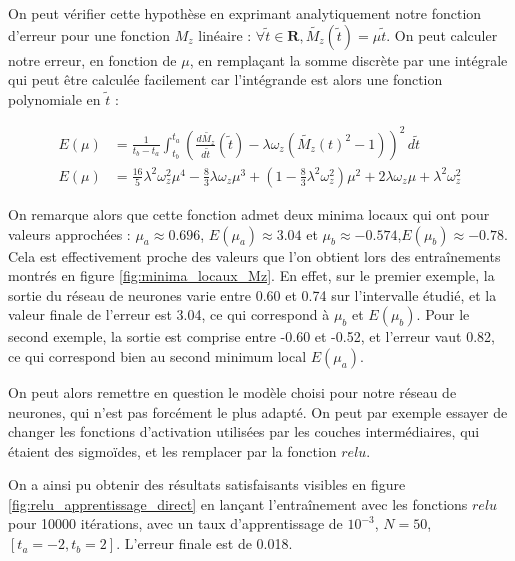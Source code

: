 \documentclass[12pt]{report}
\begin{document}
On peut vérifier cette hypothèse en exprimant analytiquement notre fonction d'erreur pour une fonction $M_z$ linéaire : $\forall \tilde{t} \in \mathbf{R}, \tilde{M_z}(\tilde{t}) = \mu  \tilde{t}$.
On peut calculer notre erreur, en fonction de $\mu$, en remplaçant la somme discrète par une intégrale qui peut être calculée facilement car
l'intégrande est alors une fonction polynomiale en $\tilde{t}$ :

\begin{equation}
    \begin{aligned}
        E(\mu) & = \frac{1}{t_b-t_a}\int_{t_b}^{t_a} (\frac{d\tilde{M_z}}{d\tilde{t}}(\tilde{t})-\lambda \omega_z (\tilde{M_z}(t)^2-1))^2 \,d \tilde{t} \\
        E(\mu) & = \frac{16}{5}\lambda^2\omega_z^2\mu^4
        - \frac{8}{3}\lambda\omega_z\mu^3
        + (1- \frac{8}{3}\lambda^2\omega_z^2)\mu^2
        + 2\lambda\omega_z\mu
        + \lambda^2\omega_z^2
    \end{aligned}
    \label{eq:fonction_erreur_analytique_M_z_lineaire}
\end{equation}

On remarque alors que cette fonction admet deux minima locaux qui ont pour valeurs approchées : $ \mu_a \approx 0.696$, $E(\mu_a) \approx 3.04$ et $\mu_b \approx -0.574$,$ E(\mu_b) \approx -0.78$.
Cela est effectivement proche des valeurs que l'on obtient lors des entraînements montrés en figure \ref{fig:minima_locaux_Mz}.
En effet, sur le premier exemple, la sortie du réseau de neurones varie entre 0.60 et 0.74 sur l'intervalle étudié, et la valeur finale de l'erreur est 3.04, ce qui correspond à $\mu_b$ et $E(\mu_b)$.
Pour le second exemple, la sortie est comprise entre -0.60 et -0.52, et l'erreur vaut 0.82, ce qui correspond bien au second minimum local $E(\mu_a)$.

On peut alors remettre en question le modèle choisi pour notre réseau de neurones, qui n'est pas forcément le plus adapté.
On peut par exemple essayer de changer les fonctions d'activation utilisées par les couches intermédiaires, qui étaient des sigmoïdes, et les remplacer par la fonction $relu$.

On a ainsi pu obtenir des résultats satisfaisants visibles en figure \ref{fig:relu_apprentissage_direct} en lançant l'entraînement avec les fonctions $relu$ pour 10000 itérations, avec un taux d'apprentissage de $10^{-3}$, $N=50$, $[t_a = -2, t_b = 2]$.
L'erreur finale est de 0.018.
\end{document}
